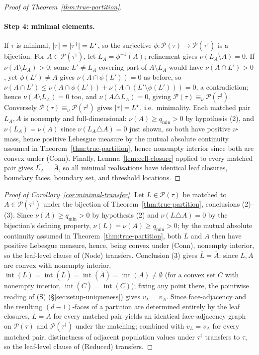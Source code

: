 \documentclass[11pt]{article}
\theoremstyle{plain}
\theoremstyle{definition}
\theoremstyle{remark}
\newcommand{\cP}{\mathcal{P}}
\DeclarePairedDelimiter{\card}{\lvert}{\rvert}
\begin{document}
\begin{proof}[Proof of Theorem~\ref{thm:true-partition}]
\paragraph*{Step 4: minimal elements.}
If \(\tau\) is minimal, \(\card\tau=\card{\tau^{\dagger}}=L^\star\), so the
surjective \(\phi:\cP(\tau)\to\cP(\tau^{\dagger})\) is a bijection. For
\(A\in\cP(\tau^{\dagger})\), let \(L_A=\phi^{-1}(A)\); refinement gives
\(\nu(L_A\setminus A)=0\). If \(\nu(A\setminus L_A)>0\), some \(L'\ne L_A\)
covering part of \(A\setminus L_A\) would have \(\nu(A\cap L')>0\), yet
\(\phi(L')\ne A\) gives \(\nu(A\cap\phi(L'))=0\) as before, so
\(\nu(A\cap L')\le\nu(A\cap\phi(L'))+\nu(A\cap(L'\setminus\phi(L')))=0\), a
contradiction; hence \(\nu(A\setminus L_A)=0\) too, and
\(\nu(A\triangle L_A)=0\), giving \(\cP(\tau)\equiv_\nu\cP(\tau^{\dagger})\).
Conversely \(\cP(\tau)\equiv_\nu\cP(\tau^{\dagger})\) gives
\(\card\tau=L^\star\), i.e.\ minimality. Each matched pair \(L_A,A\) is
nonempty and full-dimensional: \(\nu(A)\ge q_{\min}>0\) by hypothesis (2),
and \(\nu(L_A)=\nu(A)\) since \(\nu(L_A\triangle A)=0\) just shown, so both
have positive \(\nu\)-mass, hence positive Lebesgue measure by the mutual
absolute continuity assumed in Theorem~\ref{thm:true-partition}, hence
nonempty interior since both are convex under (Conn). Finally,
Lemma~\ref{lem:cell-closure} applied to every matched pair gives
\(\overline{L_A}=\overline A\), so all minimal realisations have identical
leaf closures, boundary faces, boundary set, and threshold locations.
\end{proof}

\begin{proof}[Proof of Corollary~\ref{cor:minimal-transfer}]
Let \(L\in\cP(\tau)\) be matched to \(A\in\cP(\tau^{\dagger})\) under the
bijection of Theorem~\ref{thm:true-partition}, conclusions (2)--(3). Since
\(\nu(A)\ge q_{\min}>0\) by hypothesis (2) and \(\nu(L\triangle A)=0\) by
the bijection's defining property, \(\nu(L)=\nu(A)\ge q_{\min}>0\); by the
mutual absolute continuity assumed in Theorem~\ref{thm:true-partition},
both \(L\) and \(A\) then have positive Lebesgue measure, hence, being
convex under (Conn), nonempty interior, so the leaf-level clause of (Node)
transfers. Conclusion (3) gives \(\overline L=\overline A\); since \(L,A\)
are convex with nonempty interior, \(\operatorname{int}(L)=
\operatorname{int}(\overline L)=\operatorname{int}(\overline A)=
\operatorname{int}(A)\ne\emptyset\) (for a convex set \(C\) with nonempty
interior, \(\operatorname{int}(\overline C)=\operatorname{int}(C)\));
fixing any point there, the pointwise reading of (S)
(\S\ref{sec:setup-uniqueness}) gives \(v_L=v_A\). Since face-adjacency and
the resulting \((d-1)\)-faces of a partition are determined entirely by
the leaf closures, \(\overline L=\overline A\) for every matched pair
yields an identical face-adjacency graph on \(\cP(\tau)\) and
\(\cP(\tau^{\dagger})\) under the matching; combined with \(v_L=v_A\) for
every matched pair, distinctness of adjacent population values under
\(\tau^{\dagger}\) transfers to \(\tau\), so the leaf-level clause of
(Reduced) transfers.
\end{proof}
\end{document}
